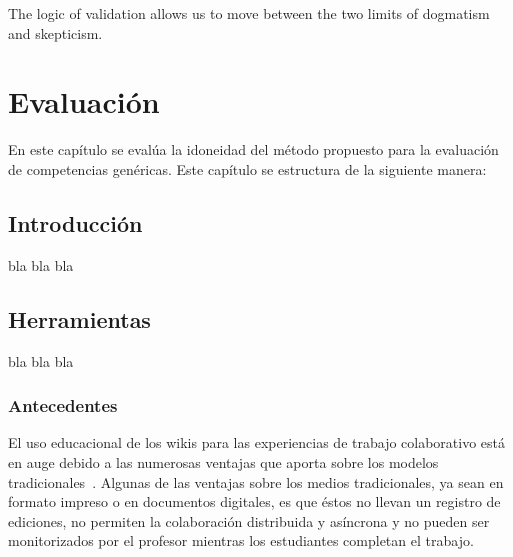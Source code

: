 

\begin{savequote}[50mm]
The logic of validation allows us to move between the two limits of dogmatism and skepticism. 
\end{savequote}


\chapter{Evaluación}
\label{cha:Validation of the methodology}

\ifpdf
    \graphicspath{{5_experiments_and_results/figures/PNG/}{5_experiments_and_results/figures/PDF/}{5_experiments_and_results/figures/}}
\else
    \graphicspath{{5_experiments_and_results/figures/EPS/}{5_experiments_and_results/figures/}}
\fi



En este capítulo se evalúa la idoneidad del método propuesto para la evaluación de competencias genéricas. Este capítulo se estructura de la siguiente manera:

\section{Introducción}

	bla bla bla

\section{Herramientas}

	bla bla bla

	\subsection{Antecedentes}

	El uso educacional de los wikis para las experiencias de trabajo colaborativo está en auge debido a las numerosas ventajas que aporta sobre los modelos tradicionales~\cite{elgort2008wiki}. Algunas de las ventajas sobre los medios tradicionales, ya sean en formato impreso o en documentos digitales, es que éstos no llevan un registro de ediciones, no permiten la colaboración distribuida y asíncrona y no pueden ser monitorizados por el profesor mientras los estudiantes completan el trabajo.

